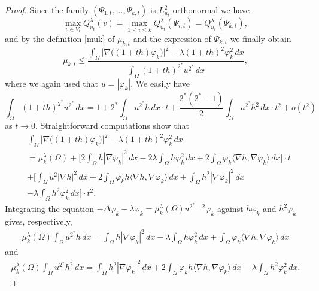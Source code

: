 \documentclass[10pt]{amsart}
\numberwithin{equation}{section}
\newcommand{\vp}{\varphi}
\newcommand{\Om}{\Omega}
\newcommand{\mkl}{\mu_{k}^{\lambda}}
\theoremstyle{plain}
\theoremstyle{remark}
\begin{document}
\begin{proof}
Since the family $(\Psi_{1,t}, \dots, \Psi_{k,t})$ is $L^2_{u_t}$-orthonormal we have 
$$ \max_{v \in V_t} Q_{u_t}^{\lambda}(v) = \max_{1 \le i \le k} Q_{u_t}^{\lambda}(\Psi_{i,t}) =Q_{u_t}^{\lambda}(\Psi_{k,t}),$$
and by the definition \eqref{muk} of $\mu_{k,t}$ and the expression of $\Psi_{k,t}$ we finally obtain
\begin{equation} \label{dersconde:001}
\mu_{k,t} \le \frac{ \int_{\Om} \big|\nabla \big( (1+th) \vp_k \big)  \big|^2 - \lambda (1+th)^2 \vp_k^2 \, dx}{\int_{\Om} (1+th)^{2^*} u^{2^*} \, dx},
\end{equation}
where we again used that $u = |\vp_k|$. We easily have
\begin{equation} \label{dersconde:002}
  \int_{\Om} (1+th)^{2^*} u^{2^*} \, dx = 1 + 2^* \int_{\Om} u^{2^*}h\, dx \cdot t   + \frac{2^*(2^*-1)}{2} \int_{\Om} u^{2^*} h^2 \, dx \cdot  t^2 + o(t^2)
  \end{equation}
 as $t \to 0$. Straightforward computations show that 
   \begin{equation} \label{dersconde:008}
\begin{aligned}
& \int_{\Om}  \big|\nabla \big( (1+th) \vp_k \big)  \big|^2 - \lambda (1+th)^2 \vp_k^2 \, dx \\
 & = \mkl(\Om) + \Bigg[ 2 \int_{\Om} h |\nabla \vp_k|^2 \, dx - 2 \lambda \int_{\Om} h \vp_k^2 \, dx + 2 \int_{\Om} \vp_k \langle \nabla h, \nabla \vp_k \rangle \, dx \Bigg] \cdot t \\
 & + \Bigg[ \int_{\Om} u^2 |\nabla h|^2 \, dx + 2 \int_\Om \vp_k h \langle \nabla h, \nabla \vp_k \rangle \, dx + \int_{\Om} h^2 |\nabla \vp_k|^2 \, dx \\
 & - \lambda \int_{\Om} h^2 \vp_k^2 \, dx \Bigg] \cdot t^2.
 \end{aligned} 
 \end{equation}
 Integrating the equation $- \Delta \vp_k - \lambda \vp_k = \mkl(\Om) u^{2^*-2} \vp_k$ against $h \vp_k$ and $h^2 \vp_k$ gives, respectively,
  $$ \begin{aligned}
 \mkl(\Om) \int_{\Om} u^{2^*} h \, dx = \int_{\Om} h |\nabla \vp_k|^2 \, dx - \lambda \int_{\Om} h \vp_k^2 \, dx + \int_{\Om} \vp_k \langle \nabla h, \nabla \vp_k \rangle \, dx
 \end{aligned} $$
 and 
  $$ \begin{aligned}
 \mkl(\Om) \int_{\Om} u^{2^*} h^2 \, dx = \int_{\Om} h^2 |\nabla \vp_k|^2 \, dx + 2 \int_\Om \vp_k h \langle \nabla h, \nabla \vp_k \rangle \, dx - \lambda \int_{\Om} h^2 \vp_k^2 \, dx . \end{aligned} $$

\end{proof}
\end{document}
